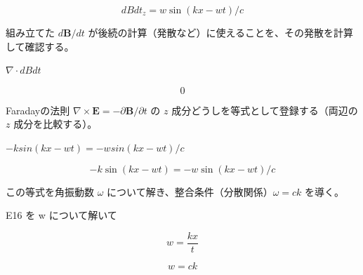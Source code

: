 \documentclass[dvipdfmx,a4paper,11pt]{jsarticle}
\begin{document}
\begin{equation}
  dBdt_z = w \sin(k x - w t)/c
  \label{eq:E14}
\end{equation}

組み立てた $d\mathbf B/dt$ が後続の計算（発散など）に使えることを、その発散を計算して確認する。

$\nabla \cdot dBdt$

\begin{equation}
  0
  \label{eq:E15}
\end{equation}

Faradayの法則 $\nabla\times\mathbf E=-\partial\mathbf B/\partial t$ の $z$ 成分どうしを等式として登録する（両辺の $z$ 成分を比較する）。

$-k sin(k x - w t) = -w sin(k x - w t)/c$

\begin{equation}
  -k \sin(k x - w t) = -w \sin(k x - w t)/c
  \label{eq:E16}
\end{equation}

この等式を角振動数 $\omega$ について解き、整合条件（分散関係）$\omega=ck$ を導く。

E16 を w について解いて

\begin{equation}
  w = \frac{k x}{t}
  \label{eq:E17}
\end{equation}

\begin{equation}
  w = c k
  \label{eq:E18}
\end{equation}
\end{document}

